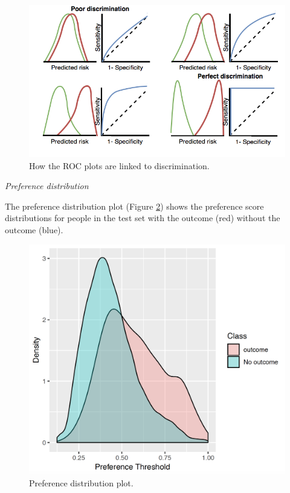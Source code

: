 \documentclass[11pt]{book}
\begin{document}
\begin{figure}
\includegraphics[width=1\linewidth]{images/PatientLevelPrediction/theory/roctheory} \caption{How the ROC plots are linked to discrimination.}\label{fig:figuretheoryroctheory}
\end{figure}

\emph{Preference distribution}

The preference distribution plot (Figure \ref{fig:plpPreference}) shows
the preference score distributions for people in the test set with the
outcome (red) without the outcome (blue).

\begin{figure}

{\centering \includegraphics[width=0.9\linewidth]{images/PatientLevelPrediction/preferencePDF} 

}

\caption{Preference distribution plot.}\label{fig:plpPreference}
\end{figure}
\end{document}
